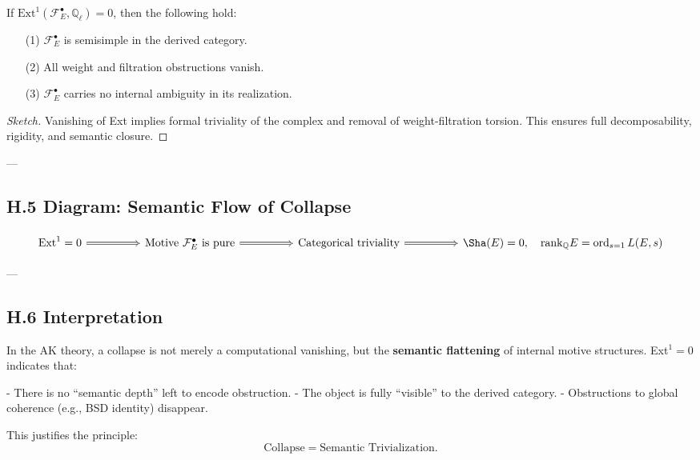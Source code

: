 \begin{theorem}
If \( \mathrm{Ext}^1(\mathcal{F}_E^\bullet, \mathbb{Q}_\ell) = 0 \), then the following hold:
\begin{itemize}
  \item[(1)] \( \mathcal{F}_E^\bullet \) is semisimple in the derived category.
  \item[(2)] All weight and filtration obstructions vanish.
  \item[(3)] \( \mathcal{F}_E^\bullet \) carries no internal ambiguity in its realization.
\end{itemize}
\end{theorem}

\begin{proof}[Sketch]
Vanishing of Ext implies formal triviality of the complex and removal of weight-filtration torsion.  
This ensures full decomposability, rigidity, and semantic closure.
\end{proof}

---

\subsection*{H.5 Diagram: Semantic Flow of Collapse}

\[
\begin{tikzcd}[row sep=large, column sep=huge]
\mathrm{Ext}^1 = 0 \arrow[r, Rightarrow] & 
\text{Motive } \mathcal{F}_E^\bullet \text{ is pure} \arrow[r, Rightarrow] & 
\text{Categorical triviality} \arrow[r, Rightarrow] & 
\Sha(E) = 0, \quad \mathrm{rank}_\mathbb{Q}E = \operatorname{ord}_{s=1}L(E,s)
\end{tikzcd}
\]

---

\subsection*{H.6 Interpretation}

In the AK theory, a collapse is not merely a computational vanishing,  
but the \textbf{semantic flattening} of internal motive structures.  
Ext$^1 = 0$ indicates that:

- There is no “semantic depth” left to encode obstruction.
- The object is fully “visible” to the derived category.
- Obstructions to global coherence (e.g., BSD identity) disappear.

This justifies the principle:
\[
\text{Collapse} = \text{Semantic Trivialization}.
\]

